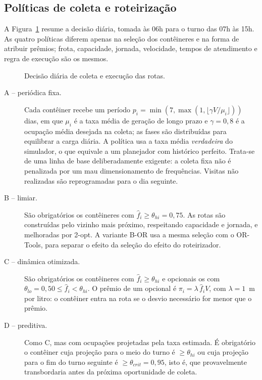 \subsection{Políticas de coleta e roteirização}\label{sec:politicas}

A Figura~\ref{fig:planejamento} resume a decisão diária, tomada às 06h para o
turno das 07h às 15h. As quatro políticas diferem apenas na seleção dos
contêineres e na forma de atribuir prêmios; frota, capacidade, jornada,
velocidade, tempos de atendimento e regra de execução são os mesmos.

\begin{figure}[ht]
  \centering
  \resizebox{0.95\textwidth}{!}{}
  \caption{Decisão diária de coleta e execução das rotas.}
  \label{fig:planejamento}
\end{figure}

\begin{description}
  \item[A -- periódica fixa.] Cada contêiner recebe um período
  $p_i = \min(7, \max(1, \lfloor \gamma V/\mu_i \rfloor))$ dias, em que
  $\mu_i$ é a taxa média de geração de longo prazo e $\gamma = 0{,}8$ é a
  ocupação média desejada na coleta; as fases são distribuídas para equilibrar
  a carga diária. A política usa a taxa média \emph{verdadeira} do simulador,
  o que equivale a um planejador com histórico perfeito. Trata-se de uma
  linha de base deliberadamente exigente: a coleta fixa não é penalizada por
  um mau dimensionamento de frequências. Visitas não realizadas são
  reprogramadas para o dia seguinte.
  \item[B -- limiar.] São obrigatórios os contêineres com $\hat f_i \ge
  \theta_{hi} = 0{,}75$. As rotas são construídas pelo vizinho mais próximo,
  respeitando capacidade e jornada, e melhoradas por 2-opt. A variante B-OR
  usa a mesma seleção com o OR-Tools, para separar o efeito da seleção do
  efeito do roteirizador.
  \item[C -- dinâmica otimizada.] São obrigatórios os contêineres com
  $\hat f_i \ge \theta_{hi}$ e opcionais os com $\theta_{lo} = 0{,}50 \le
  \hat f_i < \theta_{hi}$. O prêmio de um opcional é $\pi_i = \lambda\,\hat
  f_i V$, com $\lambda = 1$~m por litro: o contêiner entra na rota se o desvio
  necessário for menor que o prêmio.
  \item[D -- preditiva.] Como C, mas com ocupações projetadas pela taxa
  estimada. É obrigatório o contêiner cuja projeção para o meio do turno é
  $\ge \theta_{hi}$ ou cuja projeção para o fim do turno seguinte é $\ge
  \theta_{crit} = 0{,}95$, isto é, que provavelmente transbordaria antes da
  próxima oportunidade de coleta.
\end{description}

